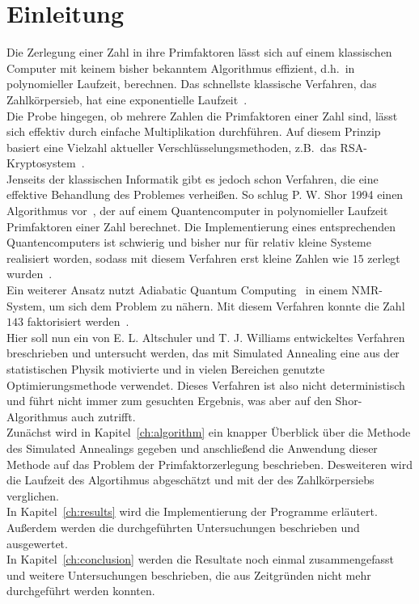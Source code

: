 \chapter{Einleitung}
\setcounter{page}{1}
Die Zerlegung einer Zahl in ihre Primfaktoren lässt sich auf einem klassischen Computer mit keinem bisher bekanntem Algorithmus effizient, d.h.\ in polynomieller Laufzeit, berechnen. Das schnellste klassische Verfahren, das Zahlkörpersieb, hat eine exponentielle Laufzeit~\parencite{pomerance}.\\
Die Probe hingegen, ob mehrere Zahlen die Primfaktoren einer Zahl sind, lässt sich effektiv durch einfache Multiplikation durchführen. Auf diesem Prinzip basiert eine Vielzahl aktueller Verschlüsselungsmethoden, z.B.\ das RSA-Kryptosystem~\parencite{rsa}. \\
Jenseits der klassischen Informatik gibt es jedoch schon Verfahren, die eine effektive Behandlung des Problemes verheißen. So schlug P. W. Shor 1994 einen Algorithmus vor~\parencite{shor}, der auf einem Quantencomputer in polynomieller Laufzeit Primfaktoren einer Zahl berechnet. Die Implementierung eines entsprechenden Quantencomputers ist schwierig und bisher nur für relativ kleine Systeme realisiert worden, sodass mit diesem Verfahren erst kleine Zahlen wie $15$ zerlegt wurden~\parencite{vandersypen}.\\
Ein weiterer Ansatz nutzt Adiabatic Quantum Computing~\parencite{suter} in einem NMR-System, um sich dem Problem zu nähern. Mit diesem Verfahren konnte die Zahl $143$ faktorisiert werden~\parencite{xu}. \\
Hier soll nun ein von E. L. Altschuler und T. J. Williams entwickeltes Verfahren~\parencite{altschuler} breschrieben und untersucht werden, das mit Simulated Annealing eine aus der statistischen Physik motivierte und in vielen Bereichen genutzte Optimierungsmethode verwendet. Dieses Verfahren ist also nicht deterministisch und führt nicht immer zum gesuchten Ergebnis, was aber auf den Shor-Algorithmus auch zutrifft.\\
Zunächst wird in Kapitel~\ref{ch:algorithm} ein knapper Überblick über die Methode des Simulated Annealings gegeben und anschließend die Anwendung dieser Methode auf das Problem der Primfaktorzerlegung beschrieben. Desweiteren wird die Laufzeit des Algortihmus abgeschätzt und mit der des Zahlkörpersiebs verglichen.\\
In Kapitel~\ref{ch:results} wird die Implementierung der Programme erläutert. Außerdem werden die durchgeführten Untersuchungen beschrieben und ausgewertet.\\
In Kapitel~\ref{ch:conclusion} werden die Resultate noch einmal zusammengefasst und weitere Untersuchungen beschrieben, die aus Zeitgründen nicht mehr durchgeführt werden konnten.
